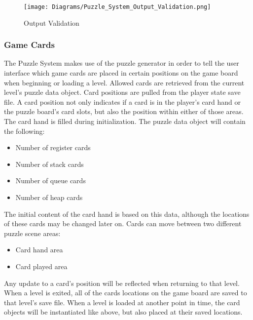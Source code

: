 \begin{figure}[t]
  \caption{Output Validation}
  \label{fig:Puzzle_System_Output_Validation}
  \centering
  \texttt{[image: Diagrams/Puzzle\_System\_Output\_Validation.png]}
\end{figure}
\vfill

\subsubsection{Game Cards}
The Puzzle System makes use of the puzzle generator in order to tell the user interface
which game cards are placed in certain positions on the game board when beginning
or loading a level. Allowed cards are retrieved from the current level's puzzle data object.
Card positions are pulled from the player state save file.
A card position not only indicates if a card is in the player's card hand or the puzzle board's
card slots, but also the position within either of those areas.\\

The card hand is filled during initialization. The puzzle data object will contain the following:
\begin{itemize}
   \item Number of register cards
   \item Number of stack cards
   \item Number of queue cards
   \item Number of heap cards
\end{itemize}

The initial content of the card hand is based on this data, although the locations
of these cards may be changed later on. Cards can move between two different puzzle scene areas:
\begin{itemize}
   \item Card hand area
   \item Card played area
\end{itemize}

Any update to a card's position will be reflected when returning to that level.
When a level is exited, all of the cards locations on the game board are saved to
that level's save file. When a level is loaded at another point in time, the card
objects will be instantiated like above, but also placed at their saved locations.\\

